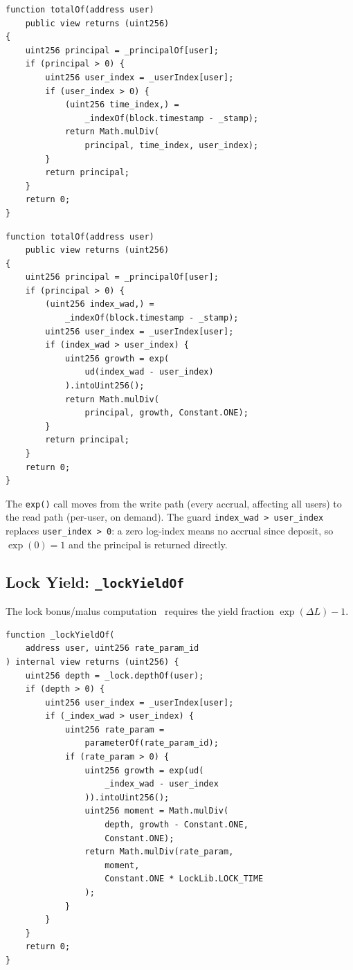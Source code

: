 \documentclass[10pt,a4paper,twocolumn]{article}
\theoremstyle{definition}
\theoremstyle{plain}
\theoremstyle{remark}
\begin{document}
\begin{lstlisting}[language=Solidity, caption={Multiplicative balance query (before)}, label={lst:totalof-ray}]
function totalOf(address user)
    public view returns (uint256)
{
    uint256 principal = _principalOf[user];
    if (principal > 0) {
        uint256 user_index = _userIndex[user];
        if (user_index > 0) {
            (uint256 time_index,) =
                _indexOf(block.timestamp - _stamp);
            return Math.mulDiv(
                principal, time_index, user_index);
        }
        return principal;
    }
    return 0;
}
\end{lstlisting}

\begin{lstlisting}[language=Solidity, caption={Log-space balance query (after)}, label={lst:totalof-log}]
function totalOf(address user)
    public view returns (uint256)
{
    uint256 principal = _principalOf[user];
    if (principal > 0) {
        (uint256 index_wad,) =
            _indexOf(block.timestamp - _stamp);
        uint256 user_index = _userIndex[user];
        if (index_wad > user_index) {
            uint256 growth = exp(
                ud(index_wad - user_index)
            ).intoUint256();
            return Math.mulDiv(
                principal, growth, Constant.ONE);
        }
        return principal;
    }
    return 0;
}
\end{lstlisting}

The \texttt{exp()} call moves from the write path (every accrual, affecting all users) to the read path (per-user, on demand). The guard \texttt{index\_wad > user\_index} replaces \texttt{user\_index > 0}: a zero log-index means no accrual since deposit, so $\exp(0) = 1$ and the principal is returned directly.

\subsection{Lock Yield: \texttt{\_lockYieldOf}}
\label{subsec:lockyield}

The lock bonus/malus computation~\cite{lck} requires the yield fraction $\exp(\Delta L) - 1$.

\begin{lstlisting}[language=Solidity, caption={Lock yield in log-space}, label={lst:lockyield}]
function _lockYieldOf(
    address user, uint256 rate_param_id
) internal view returns (uint256) {
    uint256 depth = _lock.depthOf(user);
    if (depth > 0) {
        uint256 user_index = _userIndex[user];
        if (_index_wad > user_index) {
            uint256 rate_param =
                parameterOf(rate_param_id);
            if (rate_param > 0) {
                uint256 growth = exp(ud(
                    _index_wad - user_index
                )).intoUint256();
                uint256 moment = Math.mulDiv(
                    depth, growth - Constant.ONE,
                    Constant.ONE);
                return Math.mulDiv(rate_param,
                    moment,
                    Constant.ONE * LockLib.LOCK_TIME
                );
            }
        }
    }
    return 0;
}
\end{lstlisting}
\end{document}
